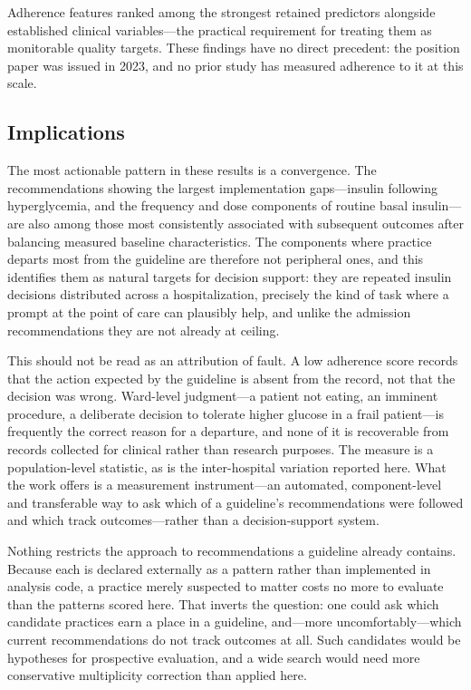 Adherence features ranked among the strongest retained predictors alongside
established clinical variables---the practical requirement for treating them
as monitorable quality targets. These findings have no direct precedent: the
position paper was issued in 2023, and no prior study has measured adherence
to it at this scale.

\subsection{Implications}

The most actionable pattern in these results is a convergence. The
recommendations showing the largest implementation gaps---insulin following
hyperglycemia, and the frequency and dose components of routine basal
insulin---are also among those most consistently associated with subsequent
outcomes after balancing measured baseline characteristics. The components
where practice departs most from the guideline are therefore not peripheral
ones, and this identifies them as natural targets for decision support: they
are repeated insulin decisions distributed across a hospitalization,
precisely the kind of task where a prompt at the point of care can plausibly
help, and unlike the admission recommendations they are not already at
ceiling.

This should not be read as an attribution of fault. A low adherence score
records that the action expected by the guideline is absent from the record,
not that the decision was wrong. Ward-level judgment---a patient not eating, an
imminent procedure, a deliberate decision to tolerate higher glucose in a frail
patient---is frequently the correct reason for a departure, and none of it is
recoverable from records collected for clinical rather than research purposes.
The measure is a population-level statistic, as is the inter-hospital variation
reported here. What the work offers is a
measurement instrument---an automated, component-level and transferable way to
ask which of a guideline's recommendations were followed and which track
outcomes---rather than a decision-support system.

Nothing restricts the approach to recommendations a guideline already contains.
Because each is declared externally as a pattern rather than implemented in
analysis code, a practice merely suspected to matter costs no more to evaluate
than the patterns scored here. That inverts the question: one could ask which
candidate practices earn a place in a guideline, and---more
uncomfortably---which current recommendations do not track outcomes at all.
Such candidates would be hypotheses for prospective evaluation, and a wide
search would need more conservative multiplicity correction than applied
here.


